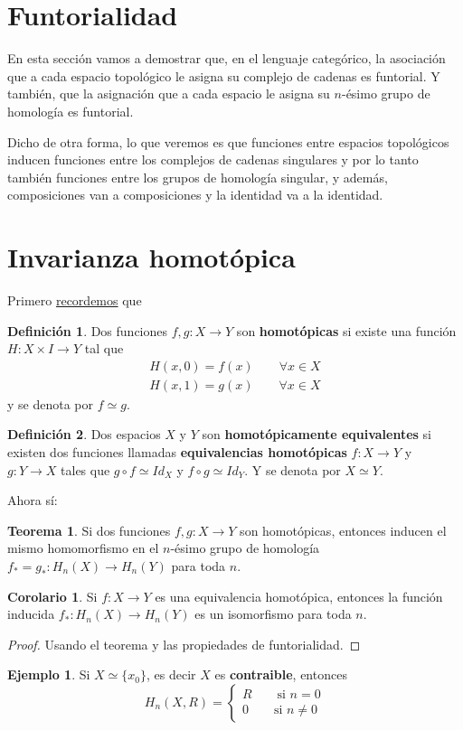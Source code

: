 \documentclass[spanish]{book}
\theoremstyle{definition}
\newtheorem*{defn}{Definición}
\newtheorem*{teo}{Teorema}
\newtheorem*{coro}{Corolario}
\newtheorem*{ejem}{Ejemplo}
\begin{document}
\section{Funtorialidad}
	En esta sección vamos a demostrar que, en el lenguaje categórico, la asociación que a cada espacio topológico le asigna su complejo de cadenas es funtorial. Y también, que la asignación que a cada espacio le asigna su $n$-ésimo grupo de homología es funtorial.
	
	Dicho de otra forma, lo que veremos es que funciones entre espacios topológicos inducen funciones entre los complejos de cadenas singulares y por lo tanto también funciones entre los grupos de homología singular, y además, composiciones van a composiciones y la identidad va a la identidad.
	
\section{Invarianza homotópica}
Primero \hyperref[def:func-homot]{recordemos} que 
\begin{defn}
	Dos funciones $f,g:X\to Y$ son \textbf{homotópicas} si existe una función $H:X\times I\to Y$ tal que
	\begin{align*}
		H(x,0)=f(x)\qquad\forall x\in X\\
		H(x,1)=g(x)\qquad\forall x\in X
	\end{align*}
	y se denota por $f\simeq g$.
\end{defn}
\begin{defn}
	Dos espacios $X$ y $Y$ son \textbf{homotópicamente equivalentes} si existen dos funciones llamadas \textbf{equivalencias homotópicas} $f:X\to Y$ y $g:Y\to X$ tales que $g\circ f\simeq Id_X$ y $f\circ g\simeq Id_Y$. Y se denota por $X\simeq Y$.
\end{defn}
Ahora sí:
\begin{teo}
	Si dos funciones $f,g:X\to Y$ son homotópicas, entonces inducen el mismo homomorfismo en el $n$-ésimo grupo de homología $f_*=g_*:H_n(X)\to H_n(Y)$ para toda $n$.
\end{teo}
\begin{coro}
	Si $f:X\to Y$ es una equivalencia homotópica, entonces la función inducida $f_*:H_n(X)\to H_n(Y)$ es un isomorfismo para toda $n$.
\end{coro}
\begin{proof}
	Usando el teorema y las propiedades de funtorialidad.
\end{proof}
\begin{ejem}
	Si $X\simeq \{x_0\}$, es decir $X$ es \textbf{contraible}, entonces \[H_n(X,R)=\begin{cases} R\qquad\text{si }n=0\\0\qquad\text{si }n\neq0\end{cases}\]
\end{ejem}
\end{document}
